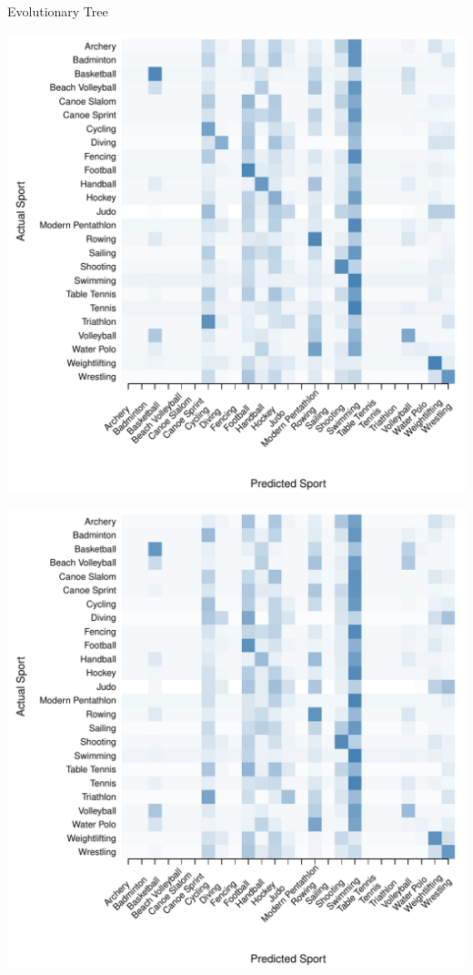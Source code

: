 \documentclass[landscape, paperwidth=42in, paperheight=36in,
fontscale=.35, margin=1in]{baposter}
\begin{document}
\begin{poster}
{\begin{center}
  Evolutionary Tree \\
  \begin{minipage}{0.45\textwidth}
    \begin{center}
      \includegraphics[scale=0.27]{../graphics/sportEV-trn.pdf}
    \end{center}
  \end{minipage}
  \hspace{0.05\textwidth}
  \begin{minipage}{0.45\textwidth}
    \begin{center}
      \includegraphics[scale=0.27]{../graphics/sportEV-tst.pdf}
    \end{center}
  \end{minipage}



\end{center}}
\end{poster}
\end{document}
